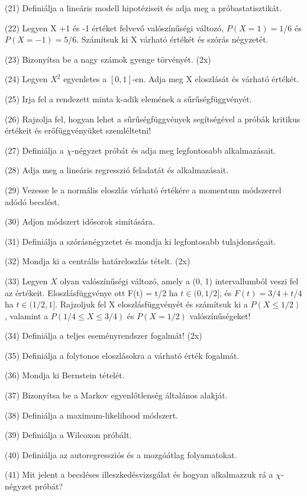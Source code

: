 \documentclass[12p]{article}
\begin{document}
(21) Definiálja a lineáris modell hipotéziseit és adja meg a próbastatisztikát.

(22) Legyen X +1 és -1 értéket felvevő valószínűségi változó, $P(X = 1) = 1/6$ és $P(X = -1) = 5/6$. Számítsuk ki X várható értékét és szórás négyzetét.

(23) Bizonyítsa be a nagy számok gyenge törvényét. (2x)

(24) Legyen $X^2$ egyenletes a $[0, 1]$-en. Adja meg X eloszlását és várható értékét.

(25) Irja fel a rendezett minta k-adik elemének a sűrűségfüggvényét.

(26) Rajzolja fel, hogyan lehet a sűrűségfüggvények segítségével a próbák kritikus értékeit és erőfüggvényüket szemléltetni!

(27) Definiálja a $\chi$-négyzet próbát és adja meg legfontosabb alkalmazásait.

(28) Adja meg a lineáris regresszió feladatát és alkalmazásait.

(29) Vezesse le a normális eloszlás várható értékére a momentum módszerrel adódó becslést.

(30) Adjon módszert idősorok simítására.

(31) Definiálja a szórásnégyzetet és mondja ki legfontosabb tulajdonságait.

(32) Mondja ki a centrális határeloszlás tételt. (2x)

(33) Legyen $X$ olyan valószínűségi változó, amely a (0, 1) intervallumból veszi fel az értékeit. Eloszlásfüggvénye ott F(t) = t/2 ha $t \in (0, 1/2]$, és $F(t) = 3/4 + t/4$ ha $t \in (1/2, 1]$. Rajzoljuk fel X eloszlásfüggvényét és számítsuk ki a $P(X \leq 1/2)$, valamint a $P(1/4 \leq X \leq 3/4)$ és $P(X = 1/2)$ valószínűségeket!

(34) Definiálja a teljes eseményrendszer fogalmát! (2x)

(35) Definiálja a folytonos eloszlásokra a várható érték fogalmát.

(36) Mondja ki Bernstein tételét.

(37) Bizonyítsa be a Markov egyenlőtlenség általános alakját.

(38) Definiálja a maximum-likelihood módszert.

(39) Definiálja a Wilcoxon próbált.

(40) Definiálja az autoregressziós és a mozgóátlag folyamatokat.

(41) Mit jelent a becsléses illeszkedésvizsgálat és hogyan alkalmazzuk rá a $\chi$-négyzet próbát?
\end{document}
